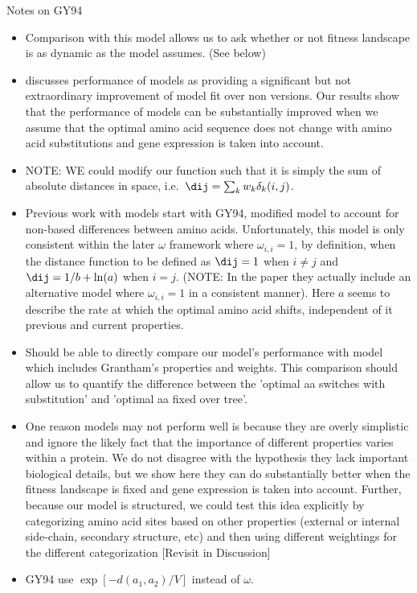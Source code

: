 
Notes on GY94
\begin{itemize}
\item Comparison with this model allows us to ask whether or not fitness landscape is as dynamic as the model assumes. (See below)
\item \citet[][p.~46]{Yang2014} discusses performance of \PC models as providing a significant but not extraordinary improvement of model fit over non \PC versions.
Our results show that the performance of \PC models can be substantially improved when we assume that the optimal amino acid sequence does not change with amino acid substitutions and gene expression is taken into account.
\item NOTE: WE could modify our \dij function such that it is simply the sum of absolute distances in \PC space, i.e.~$\dij = \sum_k w_k \delta_k(i,j)$. 
\item Previous work with \PC models start with GY94, \citet{YangEtAl98} modified model to account for non-\PC based differences between amino acids.
Unfortunately, this model is only consistent within the later $\omega$ framework where $\omega_{i,i} = 1$, by definition, when the distance function to be defined as $\dij = 1$ when $i\neq j$ and $\dij = 1/b + \ln(a)$ when $i=j$. 
(NOTE: In the paper they actually include an alternative model where $\omega_{i,i} = 1$ in a consistent manner).
Here $a$ seems to describe the rate at which the optimal amino acid shifts, independent of it previous and current \PC properties.
\item Should be able to directly compare our model's performance with \citet{YangEtAl1998} model which includes Grantham's \PC properties and weights.
This comparison should allow us to quantify the difference between the 'optimal aa switches with substitution' and 'optimal aa fixed over tree'.
\item One reason \PC models may not perform well is because they are overly simplistic and ignore the likely fact that the importance of different \PC properties varies within a protein.
We do not disagree with the hypothesis they lack important biological details, but we show here they can do substantially better when the fitness landscape is fixed and gene expression is taken into account.
Further, because our model is structured, we could test this idea explicitly by categorizing amino acid sites based on other properties (external or internal side-chain, secondary structure, etc) and then using different \PC weightings for the different categorization
[Revisit in Discussion]
\item GY94 use $\exp[- d(a_1, a_2)/V]$ instead of $\omega $. 

\end{itemize}
